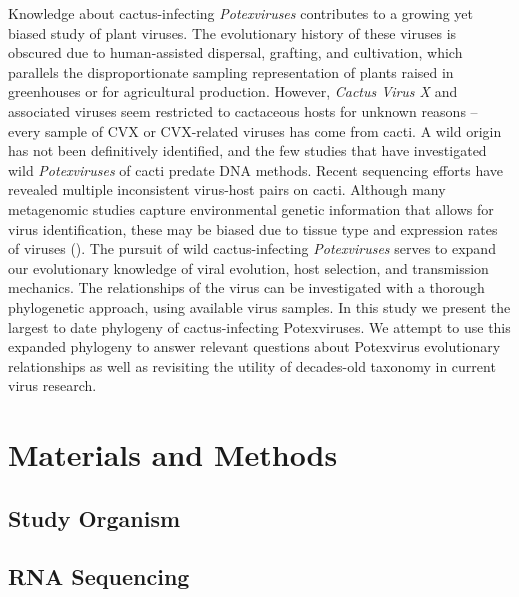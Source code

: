 \documentclass[11pt,letterpaper,titlepage]{article}
\begin{document}
\begin{linenumbers}
Knowledge about cactus-infecting \textit{Potexviruses} contributes to a growing yet biased study of plant viruses. 
The evolutionary history of these viruses is obscured due to human-assisted dispersal, grafting, and cultivation, which parallels the disproportionate sampling representation of plants raised in greenhouses or for agricultural production. 
However, \textit{Cactus Virus X} and associated viruses seem restricted to cactaceous hosts for unknown reasons -- every sample of CVX or CVX-related viruses has come from cacti. 
A wild origin has not been definitively identified, and the few studies that have investigated wild \textit{Potexviruses} of cacti predate DNA methods.
Recent sequencing efforts have revealed multiple inconsistent virus-host pairs on cacti. 
Although many metagenomic studies capture environmental genetic information that allows for virus identification, these may be biased due to tissue type and expression rates of viruses (\cite{lacroix2016methodological}). 
The pursuit of wild cactus-infecting \textit{Potexviruses} serves to expand our evolutionary knowledge of viral evolution, host selection, and transmission mechanics. 
The relationships of the virus can be investigated with a thorough phylogenetic approach, using available virus samples. 
In this study we present the largest to date phylogeny of cactus-infecting Potexviruses. 
We attempt to use this expanded phylogeny to answer relevant questions about Potexvirus evolutionary relationships as well as revisiting the utility of decades-old taxonomy in current virus research. 


\section*{Materials and Methods}

\subsection*{Study Organism}


\subsection*{RNA Sequencing}


\end{linenumbers}
\end{document}
